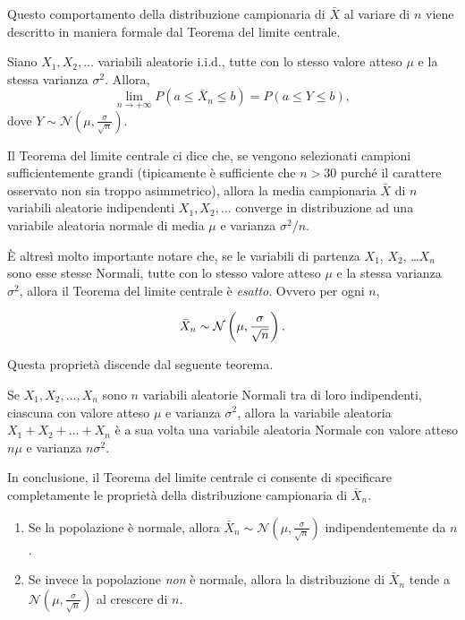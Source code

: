 Questo comportamento della distribuzione campionaria di $\bar{X}$ al variare di $n$ viene descritto in maniera formale dal Teorema del limite centrale.
\begin{teorema}
Siano $X_1, X_2, \dots$ variabili aleatorie i.i.d., tutte con lo stesso valore atteso $\mu$ e la stessa varianza $\sigma^2$. 
Allora,
\begin{equation}
\lim_{n \rightarrow +\infty} P\left(a \leq \bar{X}_n \leq b \right) = P(a \leq Y \leq b),
\label{theo:tlc}
\end{equation}
dove $Y \sim \mathcal{N}\left(\mu, \frac{\sigma}{\sqrt{n}}\right)$.
\end{teorema}

Il Teorema del limite centrale ci dice che, se vengono selezionati campioni sufficientemente grandi (tipicamente è sufficiente che $n > 30$ purché il carattere osservato non sia troppo asimmetrico), allora la media campionaria $\bar{X}$ di $n$ variabili aleatorie indipendenti $X_1, X_2, \dots$ converge in distribuzione ad una variabile aleatoria normale di media $\mu$ e varianza $\sigma^2/n$. 

È altresì molto importante notare che, se le variabili di partenza $X_1$, $X_2$, \dots $X_n$ sono esse stesse Normali, tutte con lo stesso valore atteso $\mu$ e la stessa varianza $\sigma^2$, allora il Teorema del limite centrale è \emph{esatto}. 
Ovvero per ogni $n$, 

\begin{equation}
\bar{X}_n \sim \mathcal{N}\left(\mu, \frac{\sigma}{\sqrt{n}}\right).\notag
\end{equation}

\noindent
Questa proprietà discende dal seguente teorema.

\begin{teorema}
\label{theo:lin_comb_rand_var_norm}
Se $X_1, X_2, \dots, X_n$ sono $n$ variabili aleatorie Normali tra di loro indipendenti, ciascuna con valore atteso $\mu$ e varianza $\sigma^2$, allora la variabile aleatoria $X_1 + X_2 + \dots + X_n$ è a sua volta una variabile aleatoria Normale con valore atteso $n \mu$ e varianza $n \sigma^2$.
\end{teorema}

In conclusione, il Teorema del limite centrale ci consente di specificare completamente le proprietà della distribuzione campionaria di $\bar{X}_n$.

\begin{enumerate}
\item Se la popolazione è normale, allora $\bar{X}_n \sim \mathcal{N}\left(\mu, \frac{\sigma}{\sqrt{n}}\right)$ indipendentemente da $n$.
\item Se invece la popolazione \emph{non} è normale, allora la distribuzione di $\bar{X}_n$ tende a $\mathcal{N}\left(\mu, \frac{\sigma}{\sqrt{n}}\right)$ al crescere di $n$.
\end{enumerate}

